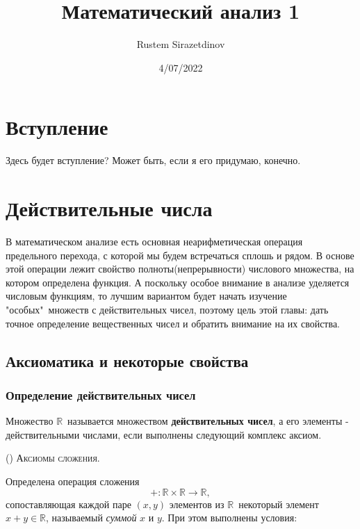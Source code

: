 \documentclass[a4paper,14pt]{report}
\title{Математический анализ 1}
\author{Rustem Sirazetdinov}
\date{4/07/2022}
\newcommand{\setR}{\ensuremath{\mathbb R}}
\newcounter{counterDef}[section]
\newcommand{\rom}[1]{\MakeUppercase{\romannumeral #1}}
\newenvironment{_def}[1][]{%
\addtocounter{counterDef}{1}
\textbf{Определение \arabic{counterDef}.}
}{\vspace{0.2cm}}
\begin{document}
    
    
    \chapter*{Вступление}
    
    Здесь будет вступление? Может быть, если я его придумаю, конечно.
    
    \chapter{Действительные числа}    
    В математическом анализе есть основная неарифметическая операция предельного перехода, с которой мы будем встречаться сплошь и рядом. В основе этой операции лежит свойство полноты(непрерывности) числового множества, на котором определена функция. А поскольку особое внимание в анализе уделяется числовым функциям, то лучшим вариантом будет начать изучение "особых"\ множеств с действительных чисел, поэтому цель этой главы: дать точное определение вещественных чисел и обратить внимание на их свойства. 
    
    \section{Аксиоматика и некоторые свойства}
    
    \subsection{Определение действительных чисел}\label{Определение}
    
    \begin{_def}
        Множество \setR\ называется множеством \textbf{действительных чисел}, а его элементы - действительными числами, если выполнены следующий комплекс аксиом.
    \end{_def}

    (\rom{1}) \textsc{Аксиомы сложения.} \par
    Определена операция сложения $$ +: \setR \times \setR \rightarrow \setR, $$ сопоставляющая каждой паре $ (x, y) $ элементов из \setR\ некоторый элемент $ x+y \in \setR $, называемый \textit{суммой} $ x $ и $ y $. При этом выполнены условия:
    
\end{document}
